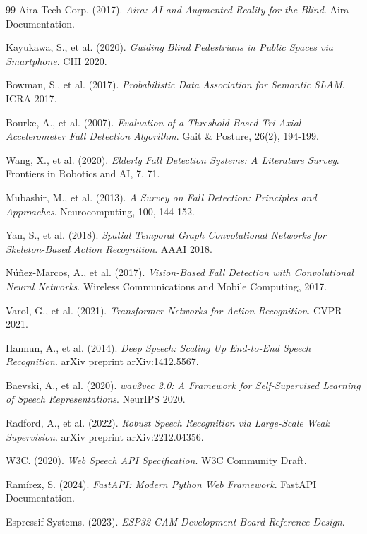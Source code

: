 \documentclass[12pt,a4paper]{report}
\begin{document}
\begin{thebibliography}{99}
Aira Tech Corp. (2017). \textit{Aira: AI and Augmented Reality for the Blind}. Aira Documentation.

Kayukawa, S., et al. (2020). \textit{Guiding Blind Pedestrians in Public Spaces via Smartphone}. CHI 2020.

Bowman, S., et al. (2017). \textit{Probabilistic Data Association for Semantic SLAM}. ICRA 2017.

Bourke, A., et al. (2007). \textit{Evaluation of a Threshold-Based Tri-Axial Accelerometer Fall Detection Algorithm}. Gait \& Posture, 26(2), 194-199.

Wang, X., et al. (2020). \textit{Elderly Fall Detection Systems: A Literature Survey}. Frontiers in Robotics and AI, 7, 71.

Mubashir, M., et al. (2013). \textit{A Survey on Fall Detection: Principles and Approaches}. Neurocomputing, 100, 144-152.

Yan, S., et al. (2018). \textit{Spatial Temporal Graph Convolutional Networks for Skeleton-Based Action Recognition}. AAAI 2018.

Núñez-Marcos, A., et al. (2017). \textit{Vision-Based Fall Detection with Convolutional Neural Networks}. Wireless Communications and Mobile Computing, 2017.

Varol, G., et al. (2021). \textit{Transformer Networks for Action Recognition}. CVPR 2021.

Hannun, A., et al. (2014). \textit{Deep Speech: Scaling Up End-to-End Speech Recognition}. arXiv preprint arXiv:1412.5567.

Baevski, A., et al. (2020). \textit{wav2vec 2.0: A Framework for Self-Supervised Learning of Speech Representations}. NeurIPS 2020.

Radford, A., et al. (2022). \textit{Robust Speech Recognition via Large-Scale Weak Supervision}. arXiv preprint arXiv:2212.04356.

W3C. (2020). \textit{Web Speech API Specification}. W3C Community Draft.

Ramírez, S. (2024). \textit{FastAPI: Modern Python Web Framework}. FastAPI Documentation.

Espressif Systems. (2023). \textit{ESP32-CAM Development Board Reference Design}.


\end{thebibliography}
\end{document}
